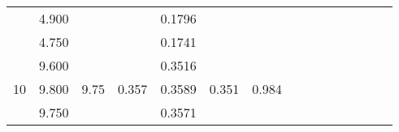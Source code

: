 \documentclass[a4paper,12pt]{article}
\begin{document}
\begin{table}[htp]
\begin{tabular}{|c|c|c|c|c|c|c|c|c|c|c|c|c|c|c|}
                       & 4.900                   &                                       &                        & 0.1796 &                        &                        &                         &                             &                                                            &                                                               &                        &                        &                         &                               \\ \cline{2-2} \cline{5-5}
                       & 4.750                   &                                       &                        & 0.1741 &                        &                        &                         &                             &                                                            &                                                               &                        &                        &                         &                               \\ \cline{1-7}
\multirow{5}{*}{10}    & 9.600                   & \multirow{5}{*}{9.75}                 & \multirow{5}{*}{0.357} & 0.3516 & \multirow{5}{*}{0.351} & \multirow{5}{*}{0.984} &                         &                             &                                                            &                                                               &                        &                        &                         &                               \\ \cline{2-2} \cline{5-5}
                       & 9.800                   &                                       &                        & 0.3589 &                        &                        &                         &                             &                                                            &                                                               &                        &                        &                         &                               \\ \cline{2-2} \cline{5-5}
                       & 9.750                   &                                       &                        & 0.3571 &                        &                        &                         &                             &                                                            &                                                               &                        &                        &                         &                               \\ \cline{2-2} \cline{5-5}

\end{tabular}
\end{table}
\end{document}
